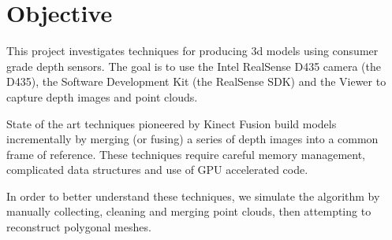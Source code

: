\section{Objective}

This project investigates techniques for producing 3d models using consumer
grade depth sensors. The goal is to use the Intel RealSense D435 camera (the D435),
the Software Development Kit (the RealSense SDK) and the Viewer to capture
depth images and point clouds.

State of the art techniques pioneered by Kinect Fusion \cite{newcombe2011kinectfusion}
 build models incrementally by merging (or fusing) a series of depth images into
 a common frame of reference. These techniques require careful memory management,
 complicated data structures and use of GPU accelerated code.

In order to better understand these techniques, we simulate the algorithm by
manually collecting, cleaning and merging point clouds, then attempting
to reconstruct polygonal meshes.
